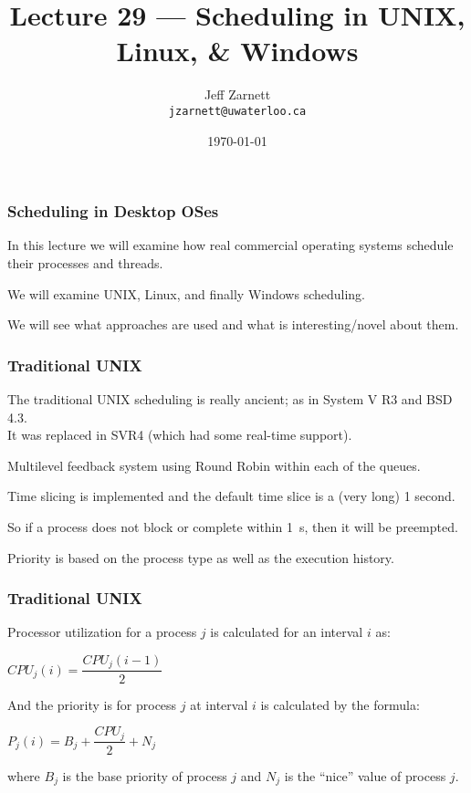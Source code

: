

\title{Lecture 29 --- Scheduling in UNIX, Linux, \& Windows }

\author{Jeff Zarnett \\ \small \texttt{jzarnett@uwaterloo.ca}}
\date{\today}




\begin{frame}
  \titlepage

 \end{frame}
 
 

\begin{frame}
\frametitle{Scheduling in Desktop OSes}

In this lecture we will examine how real commercial operating systems schedule their processes and threads. 

We will examine UNIX, Linux, and finally Windows scheduling. 

We will see what approaches are used and what is interesting/novel about them.


\end{frame}

\begin{frame}
\frametitle{Traditional UNIX}

The traditional UNIX scheduling is really ancient; as in System V R3 and BSD 4.3.\\
\quad It was replaced in SVR4 (which had some real-time support).

Multilevel feedback system using Round Robin within each of the queues. 

Time slicing is implemented and the default time slice is a (very long) 1 second. 

So if a process does not block or complete within 1~s, then it will be preempted. 

Priority is based on the process type as well as the execution history.

\end{frame}

\begin{frame}
\frametitle{Traditional UNIX}

Processor utilization for a process $j$ is calculated for an interval $i$ as:

\begin{center}
$CPU_{j}(i) = \dfrac{CPU_{j}(i - 1)}{2}$
\end{center}

And the priority is for process $j$ at interval $i$ is calculated by the formula:

\begin{center}
$P_{j}(i) = B_{j} + \dfrac{CPU_{j}}{2} + N_{j}$
\end{center}

where $B_{j}$ is the base priority of process $j$ and $N_{j}$ is the ``nice'' value of process $j$.


\end{frame}

